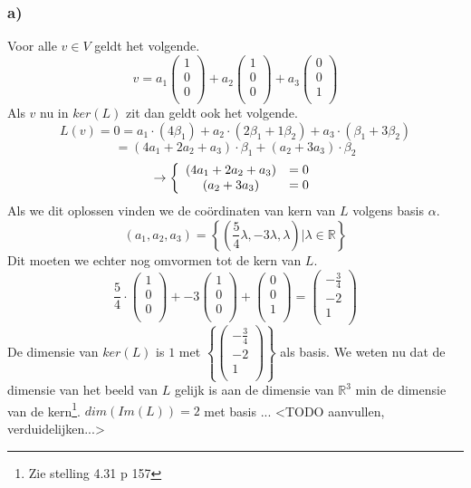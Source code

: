 \documentclass[lineaire_algebra_oplossingen.tex]{subfiles}
\begin{document}
\subsubsection*{a)}
Voor alle $v \in V$ geldt het volgende.
\[
v
=
a_1
\begin{pmatrix}
1\\0\\0\\
\end{pmatrix}
+
a_2
\begin{pmatrix}
1\\0\\0\\
\end{pmatrix}
+
a_3
\begin{pmatrix}
0\\0\\1\\
\end{pmatrix}
\]
Als $v$ nu in $ker(L)$ zit dan geldt ook het volgende.
\[
L(v) = 0 = a_1 \cdot (4\beta_1) + a_2 \cdot (2 \beta_1 + 1\beta_2) + a_3 \cdot (\beta_1 + 3\beta_2)
\]
\[
= (4a_1+2a_2+a_3)\cdot\beta_1 + (a_2+3a_3)\cdot\beta_2
\]
\[
\rightarrow
\left\lbrace
\begin{array}{c c}
(4a_1+2a_2+a_3) &= 0\\
(a_2+3a_3) &= 0\\
\end{array}
\right.
\]
Als we dit oplossen vinden we de co\"ordinaten van kern van $L$ volgens basis $\alpha$.
\[
(a_1,a_2,a_3) = 
\left\{(\frac{5}{4}\lambda,-3\lambda,\lambda) | \lambda \in \mathbb{R}\right\}
\]
Dit moeten we echter nog omvormen tot de kern van $L$.
\[
\frac{5}{4}\cdot
\begin{pmatrix}
1\\0\\0\\
\end{pmatrix}
+
-3
\begin{pmatrix}
1\\0\\0\\
\end{pmatrix}
+
\begin{pmatrix}
0\\0\\1\\
\end{pmatrix}
=
\begin{pmatrix}
-\frac{3}{4}\\-2\\1\\
\end{pmatrix}
\]
De dimensie van $ker(L)$ is $1$ met $\left\{\begin{pmatrix}-\frac{3}{4}\\-2\\1\\\end{pmatrix}\right\}$ als basis.
We weten nu dat de dimensie van het beeld van $L$ gelijk is aan de dimensie van $\mathbb{R}^3$ min de dimensie van de kern\footnote{Zie stelling 4.31 p 157}. $dim(Im(L))= 2$ met basis ... <TODO aanvullen, verduidelijken...>
\end{document}
